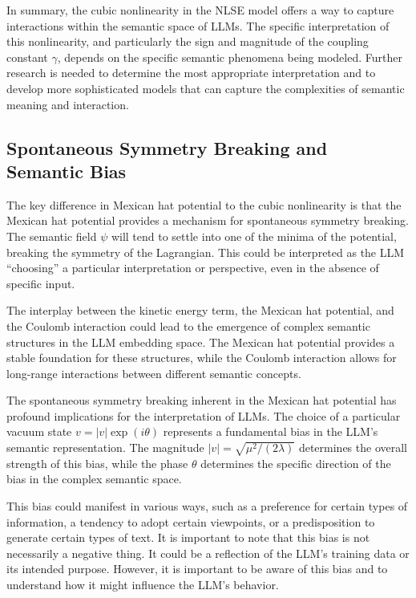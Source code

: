 \documentclass[prd,amsmath,amssymb,12pt]{revtex4}
\begin{document}
In summary, the cubic nonlinearity in the NLSE model offers a way to capture interactions within the semantic
space of LLMs. The specific interpretation of this nonlinearity, and particularly the sign and magnitude of the
coupling constant $\gamma$, depends on the specific semantic phenomena being modeled. Further research is needed
to determine the most appropriate interpretation and to develop more sophisticated models that can capture
the complexities of semantic meaning and interaction.


\subsection{Spontaneous Symmetry Breaking and Semantic Bias}

The key difference in Mexican hat potential to the cubic nonlinearity is that the Mexican hat potential
provides a mechanism for spontaneous symmetry breaking. The semantic field $\psi$ will tend to settle into
one of the minima of the potential, breaking the symmetry of the Lagrangian. This could be interpreted as
the LLM ``choosing'' a particular interpretation or perspective, even in the absence of specific input.

The interplay between the kinetic energy term, the Mexican hat potential, and the Coulomb interaction could
lead to the emergence of complex semantic structures in the LLM embedding space. The Mexican hat potential
provides a stable foundation for these structures, while the Coulomb interaction allows for long-range
interactions between different semantic concepts.

The spontaneous symmetry breaking inherent in the Mexican hat potential has profound implications for the
interpretation of LLMs. The choice of a particular vacuum state $v = |v|\exp(i\theta)$ represents a fundamental
bias in the LLM's semantic representation. The magnitude $|v| = \sqrt{\mu^2/(2\lambda)}$ determines the overall
strength of this bias, while the phase $\theta$ determines the specific direction of the bias in the complex
semantic space.

This bias could manifest in various ways, such as a preference for certain types of information, a tendency
to adopt certain viewpoints, or a predisposition to generate certain types of text. It is important to note
that this bias is not necessarily a negative thing. It could be a reflection of the LLM's training data or
its intended purpose. However, it is important to be aware of this bias and to understand how it might
influence the LLM's behavior.
\end{document}
